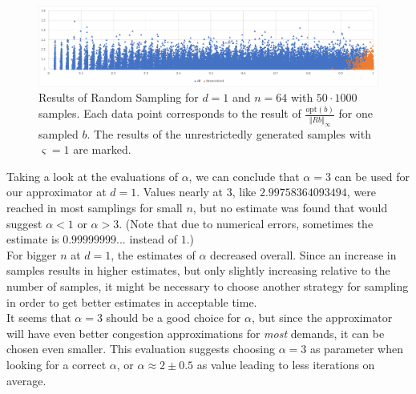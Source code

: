 \begin{figure}
\begin{center}
\includegraphics[scale=.48]{scatter-alpha-64-50-1000.png}
\end{center}
\caption{Results of Random Sampling for $d=1$ and $n=64$ with $50\cdot 1000$ samples. Each data point corresponds to the result of $\frac{\text{opt}(b)}{\Vert Rb\Vert_\infty}$ for one sampled $b$. The results of the unrestrictedly generated samples with $\varsigma=1$ are marked.}\label{res_rsample_64}
\end{figure}
Taking a look at the evaluations of $\alpha$, we can conclude that $\alpha=3$ can be used for our approximator at $d=1$. Values nearly at $3$, like $2.99758364093494$, were reached in most samplings for small $n$, but no estimate was found that would suggest $\alpha<1$ or $\alpha>3$. (Note that due to numerical errors, sometimes the estimate is $0.99999999...$ instead of $1$.)\\
For bigger $n$ at $d=1$, the estimates of $\alpha$ decreased overall. Since an increase in samples results in higher estimates, but only slightly increasing relative to the number of samples, it might be necessary to choose another strategy for sampling in order to get better estimates in acceptable time.\\

It seems that $\alpha=3$ should be a good choice for $\alpha$, but since the approximator will have even better congestion approximations for \emph{most} demands, it can be chosen even smaller. This evaluation suggests choosing $\alpha=3$ as parameter when looking for a correct $\alpha$, or $\alpha\approx 2\pm 0.5$ as value leading to less iterations on average.

